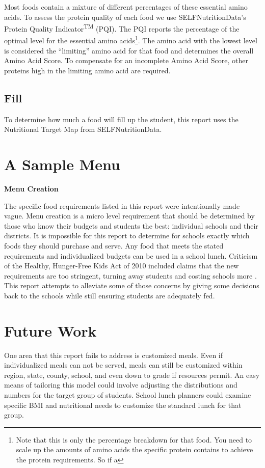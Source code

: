 \documentclass[letterpaper,oneside,12pt]{report}
\begin{document}
Most foods contain a mixture of different percentages of these essential amino acids. To assess the protein quality of each food we use SELFNutritionData's Protein Quality Indicator\textsuperscript{TM} (PQI). The PQI reports the percentage of the optimal level for the essential amino acids\footnote{Note that this is only the percentage breakdown for that food. You need to scale up the amounts of amino acids the specific protein contains to achieve the protein requirements. So if a }. The amino acid with the lowest level is considered the "`limiting"' amino acid for that food and determines the overall Amino Acid Score. To compensate for an incomplete Amino Acid Score, other proteins high in the limiting amino acid are required. 

\section{Fill}\label{Fill}

To determine how much a food will fill up the student, this report uses the Nutritional Target Map from SELFNutritionData. 

\chapter{A Sample Menu}\label{A Sample Menu}

\textbf{Menu Creation}

The specific food requirements listed in this report were intentionally made vague. Menu creation is a micro level requirement that should be determined by those who know their budgets and students the best: individual schools and their districts. It is impossible for this report to determine for schools exactly which foods they should purchase and serve. Any food that meets the stated requirements and individualized budgets can be used in a school lunch. Criticism of the Healthy, Hunger-Free Kids Act of 2010 included claims that the new requirements are too stringent, turning away students and costing schools more \cite{craiggundersen2014,juliekellyjeffstier2015,mythvsfact}. This report attempts to alleviate some of those concerns by giving some decisions back to the schools while still ensuring students are adequately fed. 

\chapter{Future Work}\label{Future Work}
One area that this report fails to address is customized meals. Even if individualized meals can not be served, meals can still be customized within region, state, county, school, and even down to grade if resources permit. An easy means of tailoring this model could involve adjusting the distributions and numbers for the target group of students. School lunch planners could examine specific BMI and nutritional needs to customize the standard lunch for that group. 



\nocite{*}
  

\end{document}

